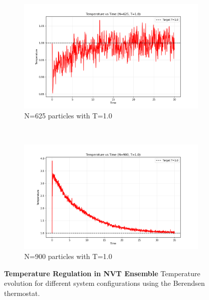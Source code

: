 \begin{figure}[H]
\begin{subfigure}{0.5\textwidth}
		\includegraphics[width=\textwidth]{media/temp_N625_T1.0.png}
		\caption{N=625 particles with T=1.0}
		\label{sfig:nvt_temp_N625_T10}
	\end{subfigure}%
	~
	\begin{subfigure}{0.5\textwidth}
		\includegraphics[width=\textwidth]{media/temp_N900_T1.0.png}
		\caption{N=900 particles with T=1.0}
		\label{sfig:nvt_temp_N900_T10}
	\end{subfigure}%
	\caption{\textbf{Temperature Regulation in NVT Ensemble} 
	Temperature evolution for different system configurations using the Berendsen thermostat.}
	\label{fig:nvt_temperature}
\end{figure}
